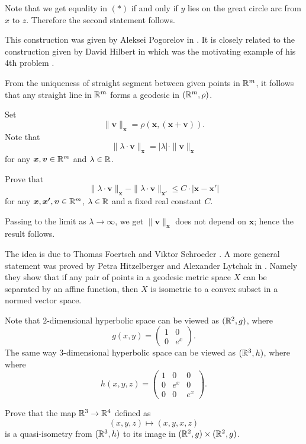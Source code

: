 Note that we get equality in $(*)$ if and only if $y$ lies on the great circle arc from $x$ to $z$.
Therefore the second statement follows.\qeds


This construction was given by 
Aleksei Pogorelov in \cite{pogorelov}.
It is closely related to the construction given 
by David Hilbert in \cite{hilbert}
which was the motivating example of his 4th problem \cite[see][]{hilbert-problems}.


From the uniqueness of straight segment between given points in $\mathbb{R}^m$,
it follows that any straight line in $\mathbb{R}^m$ forms a geodesic in $(\mathbb{R}^m,\rho)$.

Set 
\[\|\bm{v}\|_{\bm{x}}=\rho(\bm{x},(\bm{x}+\bm{v})).\]
Note that 
\[ \|\lambda\cdot\bm{v}\|_{\bm{x}}
=
|\lambda|\cdot\|\bm{v}\|_{\bm{x}}\]
for any $\bm{x},\bm{v}\in\mathbb{R}^m$ and $\lambda\in\mathbb{R}$.

Prove that 
\[
\|\lambda\cdot\bm{v}\|_{\bm{x}}
-
\|\lambda\cdot\bm{v}\|_{\bm{x}'}
\le 
C\cdot |\bm{x}-\bm{x'}|\]
for any $\bm{x},\bm{x'},\bm{v}\in\mathbb{R}^m$, 
$\lambda\in\mathbb{R}$
and a fixed real constant $C$.

Passing to the limit as $\lambda\to\infty$, 
we get
$\|\bm{v}\|_{\bm{x}}$ does not depend on $\bm{x}$;
hence the result follows.\qeds


The idea is due to Thomas Foertsch
and Viktor Schroeder \cite[see][]{foertsch-schroeder}.
A more general statement was proved by Petra Hitzelberger and Alexander Lytchak in \cite{hitzelberger-lytchak}.
Namely they show that 
if any pair of points in a geodesic metric space $X$ can be separated by an affine function,
then $X$ is isometric to a convex subset in a normed vector space.


Note that $2$-dimensional hyperbolic space 
can be viewed as $(\mathbb{R}^2,g)$, where 
\[g(x,y)=\left(\begin{matrix}
     1&0
     \\
     0&e^{x}
    \end{matrix}\right).\]
The same way $3$-dimensional hyperbolic space 
can be viewed as $(\mathbb{R}^3,h)$, where 
where 
\[h(x,y,z)=\left(\begin{matrix}
     1&0&0
     \\
     0&e^{x}&0
     \\
     0&0&e^{x}
    \end{matrix}\right).\]

Prove that the map $\mathbb{R}^3\to \mathbb{R}^4$ defined as
$$(x,y,z)\mapsto (x,y,x,z)$$
is a quasi-isometry from $(\mathbb{R}^3,h)$ to its image in $(\mathbb{R}^2,g)\times (\mathbb{R}^2,g)$.\qeds


